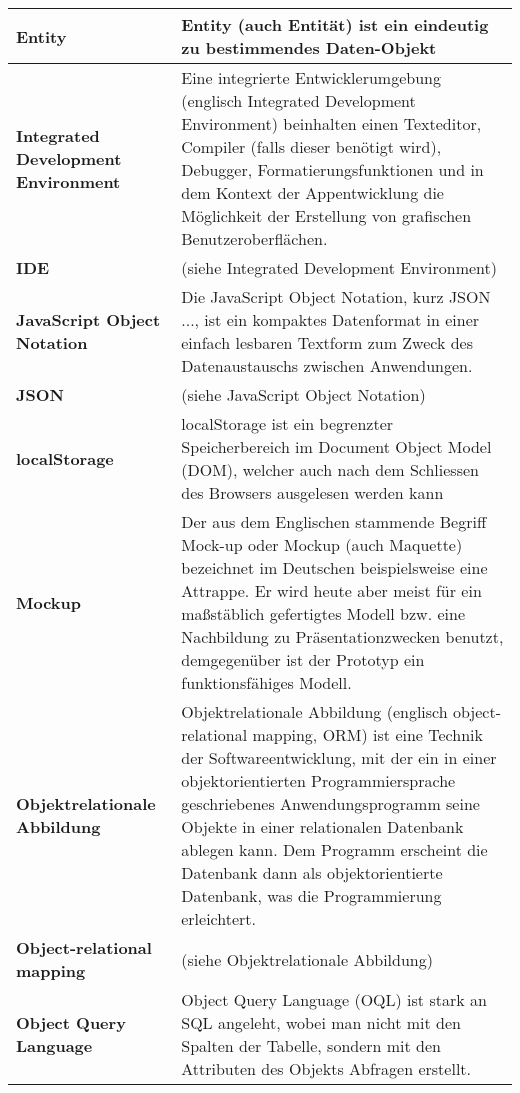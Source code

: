 \begin{longtable}{|m{3cm}|m{11cm}|}
	\textbf{Entity}&
	Entity (auch Entität) ist ein eindeutig zu bestimmendes Daten-Objekt \\ \hline	

	\textbf{Integrated Development Environment}&
	Eine integrierte Entwicklerumgebung (englisch Integrated Development Environment) beinhalten einen Texteditor, Compiler (falls dieser benötigt wird), Debugger, Formatierungsfunktionen und in dem Kontext der Appentwicklung die Möglichkeit der Erstellung von grafischen Benutzeroberflächen.\\ \hline

	\textbf{IDE}&
	(siehe Integrated Development Environment)\\ \hline

	\textbf{JavaScript Object Notation}&
	Die JavaScript Object Notation, kurz JSON ..., ist ein kompaktes Datenformat in einer einfach lesbaren Textform zum Zweck des Datenaustauschs zwischen Anwendungen.\cite{wiki_json}\\ \hline

	\textbf{JSON}&
	(siehe JavaScript Object Notation)\\ \hline

	\textbf{localStorage}&
	localStorage ist ein begrenzter Speicherbereich im Document Object Model (DOM), welcher auch nach dem Schliessen des Browsers ausgelesen werden kann\\ \hline	

	\textbf{Mockup}&
	Der aus dem Englischen stammende Begriff Mock-up oder Mockup (auch Maquette) bezeichnet im Deutschen beispielsweise eine Attrappe. Er wird heute aber meist für ein maßstäblich gefertigtes Modell bzw. eine Nachbildung zu Präsentationzwecken benutzt, demgegenüber ist der Prototyp ein funktionsfähiges Modell.\cite{wiki_mockup}\\ \hline	

	\textbf{Objektrelationale Abbildung}&
	Objektrelationale Abbildung (englisch object-relational mapping, ORM) ist eine Technik der Softwareentwicklung, mit der ein in einer objektorientierten Programmiersprache geschriebenes Anwendungsprogramm seine Objekte in einer relationalen Datenbank ablegen kann. Dem Programm erscheint die Datenbank dann als objektorientierte Datenbank, was die Programmierung erleichtert. \cite{wiki_orm}\\ \hline	

	\textbf{Object-relational mapping}&
	(siehe Objektrelationale Abbildung)\\ \hline	

	\textbf{Object Query Language}&
	Object Query Language (OQL) ist stark an SQL angeleht, wobei man nicht mit den Spalten der Tabelle, sondern mit den Attributen des Objekts Abfragen erstellt.\\ \hline	


\end{longtable}
